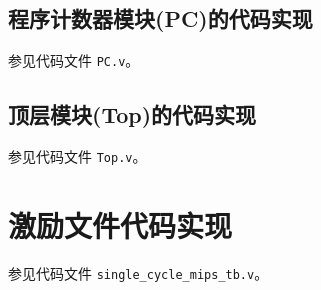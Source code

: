 \documentclass{cumcm}
\numberwithin{equation}{section}
\numberwithin{equation}{subsection}
\begin{document}
\begin{appendices}
\subsection{程序计数器模块(PC)的代码实现}\label{appsection1.9}
参见代码文件 \texttt{PC.v}。
\subsection{顶层模块(Top)的代码实现}\label{appsection1.10}
参见代码文件 \texttt{Top.v}。
\section{激励文件代码实现}\label{appsection2}
参见代码文件 \texttt{single\_cycle\_mips\_tb.v}。
\end{appendices}
\end{document}
